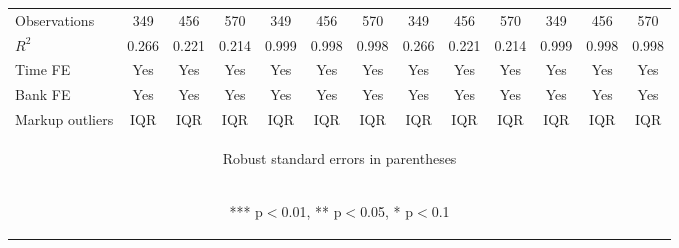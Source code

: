 \documentclass[]{article}
\begin{document}
\begin{center}
\begin{tabular}{lcccccccccccc}
Observations & 349 & 456 & 570 & 349 & 456 & 570 & 349 & 456 & 570 & 349 & 456 & 570 \\
$R^2$ & 0.266 & 0.221 & 0.214 & 0.999 & 0.998 & 0.998 & 0.266 & 0.221 & 0.214 & 0.999 & 0.998 & 0.998 \\
Time FE & Yes & Yes & Yes & Yes & Yes & Yes & Yes & Yes & Yes & Yes & Yes & Yes \\
Bank FE & Yes & Yes & Yes & Yes & Yes & Yes & Yes & Yes & Yes & Yes & Yes & Yes \\
 Markup outliers & IQR & IQR & IQR & IQR & IQR & IQR & IQR & IQR & IQR & IQR & IQR & IQR \\ \hline
\multicolumn{13}{c}{\begin{footnotesize} Robust standard errors in parentheses\end{footnotesize}} \\
\multicolumn{13}{c}{\begin{footnotesize} *** p$<$0.01, ** p$<$0.05, * p$<$0.1\end{footnotesize}} \\
\end{tabular}
\end{center}
\end{document}
